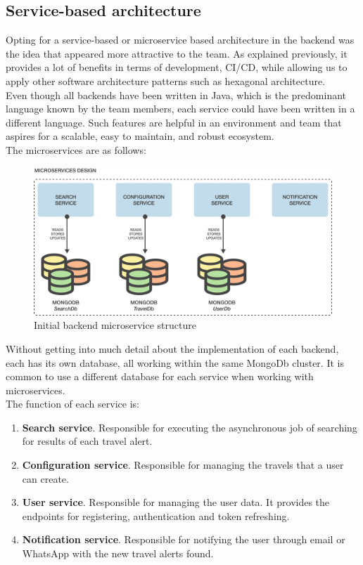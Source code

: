 \documentclass[./chapters/design.tex]{subfiles}
\begin{document}
\subsection{Service-based architecture}
Opting for a service-based or microservice based architecture in the backend was
the idea that appeared more attractive to the team. As explained previously, it
provides a lot of benefits in terms of development, CI/CD, while allowing us to
apply other software architecture patterns such as hexagonal architecture.
\\
Even though all backends have been written in Java, which is the predominant
language known by the team members, each service could have been written in a
different language. Such features are helpful in an environment and team that
aspires for a scalable, easy to maintain, and robust ecosystem.
\\[8pt]
The microservices are as follows:
\begin{figure}[H]
	\centering
	\includegraphics[width=\textwidth]{./assets/microservice-struct.png}
	\caption{Initial backend microservice structure}
\end{figure}
Without getting into much detail about the implementation of each backend, each
has its own database, all working within the same MongoDb cluster. It is common
to use a different database for each service when working with microservices.
\\
The function of each service is:
\begin{enumerate}[label = -]
	\item\textbf{Search service}. Responsible for executing the asynchronous job
	of searching for results of each travel alert.
	\item\textbf{Configuration service}. Responsible for managing the travels that
	a user can create.
	\item\textbf{User service}. Responsible for managing the user data. It
	provides the endpoints for registering, authentication and token refreshing.
	\item\textbf{Notification service}. Responsible for notifying the user through
	email or WhatsApp with the new travel alerts found.
\end{enumerate}
\end{document}
